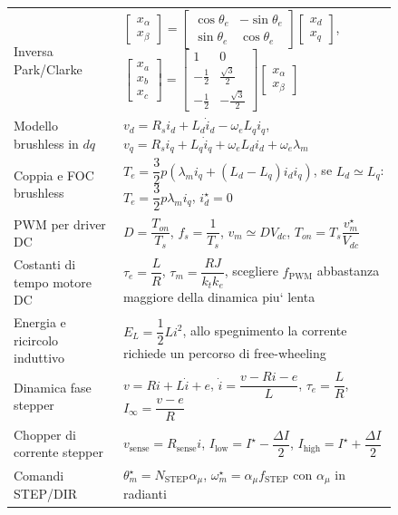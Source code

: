 \documentclass[11pt,a4paper]{article}
\begin{document}
{\begin{longtable}{>{\raggedright\arraybackslash}p{0.24\linewidth}>{\raggedright\arraybackslash}p{0.60\linewidth}}
Inversa Park/Clarke & $\begin{bmatrix}x_\alpha\\x_\beta\end{bmatrix}=\begin{bmatrix}\cos\theta_e&-\sin\theta_e\\\sin\theta_e&\cos\theta_e\end{bmatrix}\begin{bmatrix}x_d\\x_q\end{bmatrix}$, \quad $\begin{bmatrix}x_a\\x_b\\x_c\end{bmatrix}=\begin{bmatrix}1&0\\-\frac12&\frac{\sqrt3}{2}\\-\frac12&-\frac{\sqrt3}{2}\end{bmatrix}\begin{bmatrix}x_\alpha\\x_\beta\end{bmatrix}$ \\
Modello brushless in $dq$ & $v_d=R_s i_d+L_d\dot i_d-\omega_eL_qi_q$, \quad $v_q=R_s i_q+L_q\dot i_q+\omega_eL_di_d+\omega_e\lambda_m$ \\
Coppia e FOC brushless & $T_e=\dfrac{3}{2}p\left(\lambda_m i_q+(L_d-L_q)i_di_q\right)$, \quad se $L_d\simeq L_q$: $T_e=\dfrac{3}{2}p\lambda_m i_q$, \quad $i_d^\star=0$ \\
PWM per driver DC & $D=\dfrac{T_{on}}{T_s}$, \quad $f_s=\dfrac{1}{T_s}$, \quad $v_m\simeq D V_{dc}$, \quad $T_{on}=T_s\dfrac{v_m^\star}{V_{dc}}$ \\
Costanti di tempo motore DC & $\tau_e=\dfrac{L}{R}$, \quad $\tau_m=\dfrac{RJ}{k_tk_e}$, \quad scegliere $f_{\text{PWM}}$ abbastanza maggiore della dinamica piu` lenta \\
Energia e ricircolo induttivo & $E_L=\dfrac{1}{2}Li^2$, \quad allo spegnimento la corrente richiede un percorso di free-wheeling \\
Dinamica fase stepper & $v=Ri+L\dot i+e$, \quad $\dot i=\dfrac{v-Ri-e}{L}$, \quad $\tau_e=\dfrac{L}{R}$, \quad $I_\infty=\dfrac{v-e}{R}$ \\
Chopper di corrente stepper & $v_{\text{sense}}=R_{\text{sense}}i$, \quad $I_{\text{low}}=I^\star-\dfrac{\Delta I}{2}$, \quad $I_{\text{high}}=I^\star+\dfrac{\Delta I}{2}$ \\
Comandi STEP/DIR & $\theta_m^\star=N_{\text{STEP}}\alpha_\mu$, \quad $\omega_m^\star=\alpha_\mu f_{\text{STEP}}$ con $\alpha_\mu$ in radianti \\

\end{longtable}}
\end{document}
